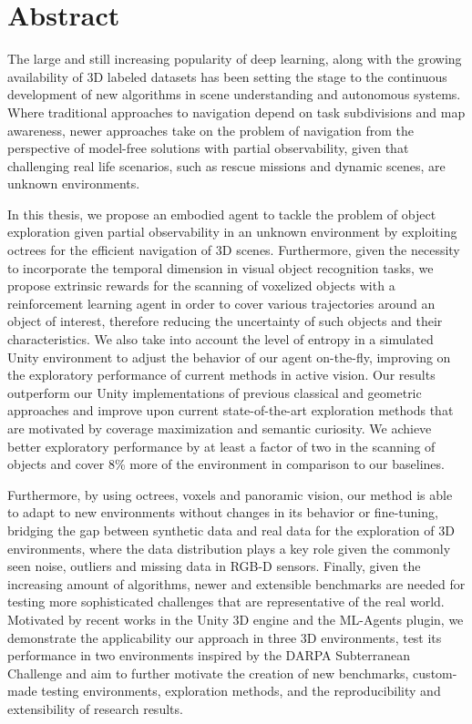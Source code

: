 \chapter*{Abstract}

The large and still increasing popularity of deep learning, along with the growing availability of 3D labeled datasets has been setting the stage to the continuous development of new algorithms in scene understanding and autonomous systems. Where traditional approaches to navigation depend on task subdivisions and map awareness, newer approaches take on the problem of navigation from the perspective of model-free solutions with partial observability, given that challenging real life scenarios, such as rescue missions and dynamic scenes, are unknown environments.

In this thesis, we propose an embodied agent to tackle the problem of object exploration given partial observability in an unknown environment by exploiting octrees for the efficient navigation of 3D scenes. Furthermore, given the necessity to incorporate the temporal dimension in visual object recognition tasks, we propose extrinsic rewards for the scanning of voxelized objects with a reinforcement learning agent in order to cover various trajectories around an object of interest, therefore reducing the uncertainty of such objects and their characteristics.
We also take into account the level of entropy in a simulated Unity environment to adjust the behavior of our agent on-the-fly, improving on the exploratory performance of current methods in active vision. 
Our results outperform our Unity implementations of previous classical and geometric approaches and improve upon current state-of-the-art exploration methods that are motivated by coverage maximization and semantic curiosity. We achieve better exploratory performance by at least a factor of two in the scanning of objects and cover 8\% more of the environment in comparison to our baselines.

Furthermore, by using octrees, voxels and panoramic vision, our method is able to adapt to new environments without changes in its behavior or fine-tuning, bridging the gap between synthetic data and real data for the exploration of 3D environments, where the data distribution plays a key role given the commonly seen noise, outliers and missing data in RGB-D sensors.
Finally, given the increasing amount of algorithms, newer and extensible benchmarks are needed for testing more sophisticated challenges that are representative of the real world. Motivated by recent works in the Unity 3D engine and the ML-Agents plugin, we demonstrate the applicability our approach in three 3D environments, test its performance in two environments inspired by the DARPA Subterranean Challenge and aim to further motivate the creation of new benchmarks, custom-made testing environments, exploration methods, and the reproducibility and extensibility of research results.

